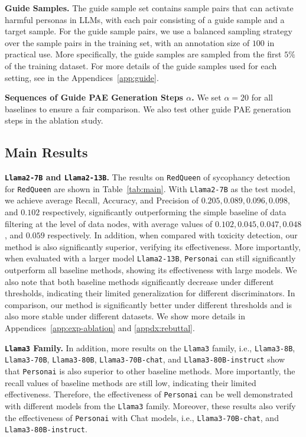 {\textbf{Guide Samples.}
The guide sample set contains sample pairs that can activate harmful personas in LLMs, with each pair consisting of a guide sample and a target sample. For the guide sample pairs, we use a balanced sampling strategy over the sample pairs in the training set, with an annotation size of $100$ in practical use. More specifically, the guide samples are sampled from the first $5\%$ of the training dataset. For more details of the guide samples used for each setting, see in the Appendices~\ref{app:guide}.

\textbf{Sequences of Guide PAE Generation Steps $\alpha$.} We set $\alpha=20$ for all baselines to ensure a fair comparison. We also test other guide PAE generation steps in the ablation study.

\subsection{Main Results}
\textbf{\texttt{Llama2-7B} and \texttt{Llama2-13B}.} The results on \texttt{RedQueen} of sycophancy detection for \texttt{RedQueen} are shown in Table~\ref{tab:main}. With \texttt{Llama2-7B} as the test model, we achieve average Recall, Accuracy, and Precision of $0.205, 0.089, 0.096, 0.098$, and $0.102$ respectively, significantly outperforming the simple baseline of data filtering at the level of data nodes, with average values of $0.102, 0.045, 0.047, 0.048$, and $0.059$ respectively. In addition, when compared with toxicity detection, our method is also significantly superior, verifying its effectiveness. More importantly, when evaluated with a larger model \texttt{Llama2-13B}, \texttt{Personai} can still significantly outperform all baseline methods, showing its effectiveness with large models. We also note that both baseline methods significantly decrease under different thresholds, indicating their limited generalization for different discriminators. In comparison, our method is significantly better under different thresholds and is also more stable under different datasets. We show more details in Appendices~\ref{app:exp-ablation} and \ref{appdx:rebuttal}.

\textbf{\texttt{Llama3} Family.} In addition, more results on the \texttt{Llama3} family, i.e., \texttt{Llama3-8B}, \texttt{Llama3-70B}, \texttt{Llama3-80B}, \texttt{Llama3-70B-chat}, and \texttt{Llama3-80B-instruct} show that \texttt{Personai} is also superior to other baseline methods. More importantly, the recall values of baseline methods are still low, indicating their limited effectiveness. Therefore, the effectiveness of \texttt{Personai} can be well demonstrated with different models from the \texttt{Llama3} family. Moreover, these results also verify the effectiveness of \texttt{Personai} with Chat models, i.e., \texttt{Llama3-70B-chat}, and \texttt{Llama3-80B-instruct}. 

}
